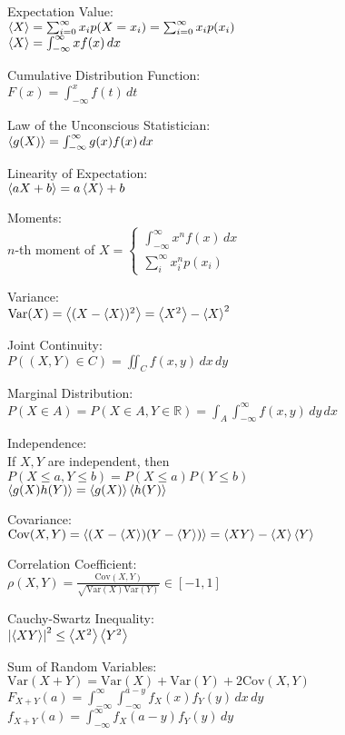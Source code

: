 \documentclass[12pt,landscape]{article}
\newcommand{\tab}{\hspace*{1em}}
\newcommand{\ds}{\displaystyle}
\newcommand{\Var}[1]{\mathrm{Var}(#1)}
\newcommand{\Cov}[1]{\mathrm{Cov}(#1)}
\theoremstyle{definition}
\begin{document}
\begin{multicols}{3}
Expectation Value:\\
\tab $\expval{X} = \sum_{i=0}^{\infty} x_i p(X = x_i) = \sum_{i=0}^{\infty} x_i p(x_i)$\\
\tab $\expval{X} = \int_{-\infty}^\infty xf(x)\,dx$

Cumulative Distribution Function:\\
\tab $F(x) = \int_{-\infty}^{x} f(t)\,dt$

Law of the Unconscious Statistician:\\
\tab $\expval{g(X)} = \int_{-\infty}^{\infty}g(x)f(x)\,dx$

Linearity of Expectation:\\
\tab $\expval{aX+b} = a\expval{X} + b$

Moments:\\
\tab $n$-th moment of $X = \begin{cases}
\int_{-\infty}^{\infty}x^n f(x)\,dx & \,\\
\sum_{i}^{\infty} x_i^n p(x_i) & \,
\end{cases}$

Variance:\\
\tab $\Var{X} = \expval{(X-\expval{X})^2} = \expval{X^2} - \expval{X}^2$

Joint Continuity:\\
\tab $P((X,Y)\in C) = \iint_C f(x,y)\,dx\,dy$

Marginal Distribution:\\
\tab $P(X\in A) = P(X \in A, Y \in \mathbb{R}) = \int_A \int_{-\infty}^{\infty}f(x,y)\,dy\,dx$

Independence:\\
If $X,Y$ are independent, then\\
\tab $P(X\leq a, Y\leq b) = P(X\leq a)P(Y\leq b)$\\
\tab $\expval{g(X)h(Y)} = \expval{g(X)}\expval{h(Y)}$

Covariance:\\
\tab $\Cov{X,Y} = \expval{(X-\expval{X})(Y-\expval{Y})} = \expval{XY} - \expval{X}\expval{Y}$

Correlation Coefficient:\\
\tab $\ds \rho(X,Y) = \frac{\Cov{X,Y}}{\sqrt{\Var{X}\Var{Y}}} \in [-1,1]$

Cauchy-Swartz Inequality:\\
\tab $\abs{\expval{XY}}^2 \leq \expval{X^2}\expval{Y^2}$

Sum of Random Variables:\\
\tab $\Var{X+Y} = \Var{X} + \Var{Y} + 2\Cov{X,Y}$\\
\tab $\ds F_{X+Y}(a)=\int_{-\infty}^\infty\int_{-\infty}^{a-y}f_X(x)f_Y(y)\,dx\,dy$\\
\tab $\ds f_{X+Y}(a)=\int_{-\infty}^\infty f_X(a-y)f_Y(y)\,dy$


\end{multicols}
\end{document}
